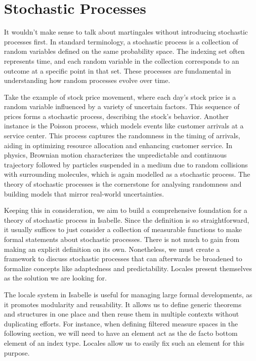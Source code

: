 ﻿%

\chapter{Stochastic Processes}\label{chapter:stochastic_processes}

It wouldn't make sense to talk about martingales without introducing stochastic processes first. In standard terminology, a stochastic process is a collection of random variables defined on the same probability space. The indexing set often represents time, and each random variable in the collection corresponds to an outcome at a specific point in that set. These processes are fundamental in understanding how random processes evolve over time. 

Take the example of stock price movement, where each day's stock price is a random variable influenced by a variety of uncertain factors. This sequence of prices forms a stochastic process, describing the stock's behavior. Another instance is the Poisson process, which models events like customer arrivals at a service center. This process captures the randomness in the timing of arrivals, aiding in optimizing resource allocation and enhancing customer service. In physics, Brownian motion characterizes the unpredictable and continuous trajectory followed by particles suspended in a medium due to random collisions with surrounding molecules, which is again modelled as a stochastic process. The theory of stochastic processes is the cornerstone for analysing randomness and building models that mirror real-world uncertainties.

Keeping this in consideration, we aim to build a comprehensive foundation for a theory of stochastic process in Isabelle. Since the definition is so straightforward, it usually suffices to just consider a collection of measurable functions to make formal statements about stochastic processes. There is not much to gain from making an explicit definition on its own. Nonetheless, we must create a framework to discuss stochastic processes that can afterwards be broadened to formalize concepts like adaptedness and predictability. Locales present themselves as the solution we are looking for.

The locale system in Isabelle is useful for managing large formal developments, as it promotes modularity and reusability. It allows us to define generic theorems and structures in one place and then reuse them in multiple contexts without duplicating efforts. For instance, when defining filtered measure spaces in the following section, we will need to have an element act as the de facto bottom element of an index type. Locales allow us to easily fix such an element for this purpose.

